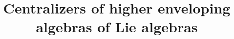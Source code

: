 \documentclass[11pt]{amsart}
\numberwithin{equation}{section}
\begin{document}
\title{Centralizers of higher enveloping algebras of Lie algebras}

%


\maketitle
\thispagestyle{empty}




\tableofcontents
 
\end{document}
